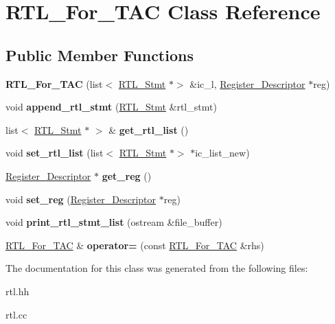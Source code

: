 \hypertarget{classRTL__For__TAC}{}\section{R\+T\+L\+\_\+\+For\+\_\+\+T\+AC Class Reference}
\label{classRTL__For__TAC}
\subsection*{Public Member Functions}
\begin{DoxyCompactItemize}
\item 
\mbox{\label{classRTL__For__TAC_a5a23ee47f5476663e8fb60fd27c3dfc1}} 
{\bfseries R\+T\+L\+\_\+\+For\+\_\+\+T\+AC} (list$<$ \hyperlink{classRTL__Stmt}{R\+T\+L\+\_\+\+Stmt} $\ast$$>$ \&ic\+\_\+l, \hyperlink{classRegister__Descriptor}{Register\+\_\+\+Descriptor} $\ast$reg)
\item 
\mbox{\label{classRTL__For__TAC_a685ae28f0b6573199418e4957e7051c1}} 
void {\bfseries append\+\_\+rtl\+\_\+stmt} (\hyperlink{classRTL__Stmt}{R\+T\+L\+\_\+\+Stmt} \&rtl\+\_\+stmt)
\item 
\mbox{\label{classRTL__For__TAC_adb527a3e21bc516907a8cf45eea983d7}} 
list$<$ \hyperlink{classRTL__Stmt}{R\+T\+L\+\_\+\+Stmt} $\ast$ $>$ \& {\bfseries get\+\_\+rtl\+\_\+list} ()
\item 
\mbox{\label{classRTL__For__TAC_a3be420d42f2068c4efed48882db9f49f}} 
void {\bfseries set\+\_\+rtl\+\_\+list} (list$<$ \hyperlink{classRTL__Stmt}{R\+T\+L\+\_\+\+Stmt} $\ast$$>$ $\ast$ic\+\_\+list\+\_\+new)
\item 
\mbox{\label{classRTL__For__TAC_a3293f4467710f47e3afaec85abdacde1}} 
\hyperlink{classRegister__Descriptor}{Register\+\_\+\+Descriptor} $\ast$ {\bfseries get\+\_\+reg} ()
\item 
\mbox{\label{classRTL__For__TAC_ae5112dd75f50d2f6275965ab864aedea}} 
void {\bfseries set\+\_\+reg} (\hyperlink{classRegister__Descriptor}{Register\+\_\+\+Descriptor} $\ast$reg)
\item 
\mbox{\label{classRTL__For__TAC_a0c219dedd4500061e2706fa7dfa0fef5}} 
void {\bfseries print\+\_\+rtl\+\_\+stmt\+\_\+list} (ostream \&file\+\_\+buffer)
\item 
\mbox{\label{classRTL__For__TAC_a28b37eaf986d21b3ea3944f1b13f8eb6}} 
\hyperlink{classRTL__For__TAC}{R\+T\+L\+\_\+\+For\+\_\+\+T\+AC} \& {\bfseries operator=} (const \hyperlink{classRTL__For__TAC}{R\+T\+L\+\_\+\+For\+\_\+\+T\+AC} \&rhs)
\end{DoxyCompactItemize}


The documentation for this class was generated from the following files\+:\begin{DoxyCompactItemize}
\item 
rtl.\+hh\item 
rtl.\+cc\end{DoxyCompactItemize}

